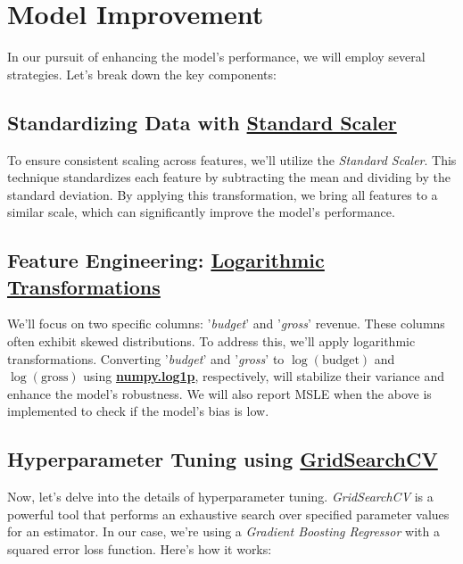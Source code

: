 \documentclass[conference]{IEEEtran}
\begin{document}
\section{Model Improvement}
    In our pursuit of enhancing the model's performance, we will employ several strategies. Let's break down the key components:

    \subsection{Standardizing Data with \href{https://scikit-learn.org/stable/modules/generated/sklearn.preprocessing.StandardScaler.html}{Standard Scaler}}

        To ensure consistent scaling across features, we'll utilize the \textit{Standard Scaler}. This technique standardizes each feature by subtracting the mean and dividing by the standard deviation. By applying this transformation, we bring all features to a similar scale, which can significantly improve the model's performance.

    \subsection{Feature Engineering: \href{https://numpy.org/doc/stable/reference/generated/numpy.log1p.html}{Logarithmic Transformations}}

        We'll focus on two specific columns: '\textit{budget}' and '\textit{gross}' revenue. These columns often exhibit skewed distributions. To address this, we'll apply logarithmic transformations. Converting '\textit{budget}' and '\textit{gross}' to \textit{\(\log(\text{budget})\)} and \textit{\(\log(\text{gross})\)} using \href{https://numpy.org/doc/stable/reference/generated/numpy.log1p.html}{\textbf{numpy.log1p}}, respectively, will stabilize their variance and enhance the model's robustness. We will also report MSLE when the above is implemented to check if the model's bias is low.

    \subsection{Hyperparameter Tuning using \href{https://scikit-learn.org/stable/modules/generated/sklearn.model_selection.GridSearchCV.html}{GridSearchCV}}

    Now, let's delve into the details of hyperparameter tuning. \textit{GridSearchCV} is a powerful tool that performs an exhaustive search over specified parameter values for an estimator. In our case, we're using a \textit{Gradient Boosting Regressor} with a squared error loss function. Here's how it works:
\end{document}

